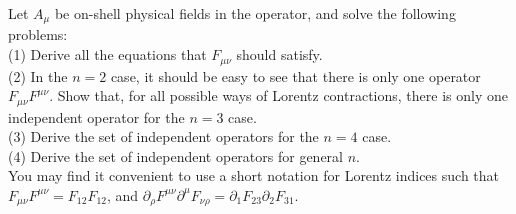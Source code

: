 {\noindent
Let $A_\mu$ be on-shell physical fields in the operator, and solve the following problems:\\
\noindent
(1) %
Derive all the equations that $F_{\mu\nu}$ should satisfy.  \\
(2) In the $n=2$ case, it should be easy to see that there is only one operator  $F_{\mu\nu} F^{\mu\nu}$.
Show that, for all possible ways of Lorentz contractions, there is only one independent operator for the $n = 3$ case. \\
(3)  Derive the set of independent operators for the $n=4$ case. \\
(4) Derive the set of independent operators for general $n$.\\
\noindent 
You may find it convenient to use a short notation for Lorentz indices such that $F_{\mu\nu}F^{\mu\nu} = F_{12} F_{12}$, and $\partial_\rho F^{\mu\nu} \partial^\mu F_{\nu\rho} = \partial_1 F_{23} \partial_2 F_{31}$.

}
 

